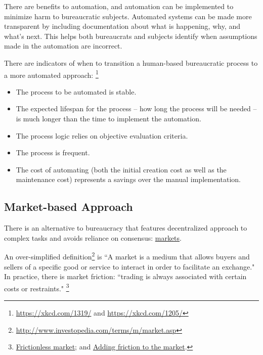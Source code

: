 There are benefits to automation, and automation can be implemented to minimize harm to bureaucratic subjects.  Automated systems can be made more transparent by including documentation about what is happening, why, and what's next.
This helps both bureaucrats and subjects identify when assumptions made in the automation are incorrect. 


There are indicators of when to transition a human-based bureaucratic process to a more automated approach:
\footnote{\href{https://xkcd.com/1319/}{https://xkcd.com/1319/} and \href{https://xkcd.com/1205/}{https://xkcd.com/1205/}}
\begin{itemize}
    \item The process to be automated is stable.
    \item The expected lifespan for the process -- how long the process will be needed -- is much longer than the time to implement the automation.
\item The process logic relies on objective evaluation criteria.  
\item The process is frequent.
\item The cost of automating (both the initial creation cost as well as the maintenance cost) represents a savings over the manual implementation.
\end{itemize}


\subsection{Market-based Approach}

There is an alternative to bureaucracy that features decentralized approach to complex tasks and avoids reliance on consensus: \href{https://en.wikipedia.org/wiki/Market_(economics)}{markets}.

An over-simplified definition\footnote{\href{http://www.investopedia.com/terms/m/market.asp}{http://www.investopedia.com/terms/m/market.asp}} is ``A market is a medium that allows buyers and sellers of a specific good or service to interact in order to facilitate an exchange." 
In practice, there is market friction: ``trading is always associated with certain costs or restraints."
\footnote{\href{http://www.investopedia.com/terms/f/frictionlessmarket.asp}{Frictionless market};
and \href{https://insight.kellogg.northwestern.edu/article/adding_friction_to_the_market}{Adding friction to the market}.}

